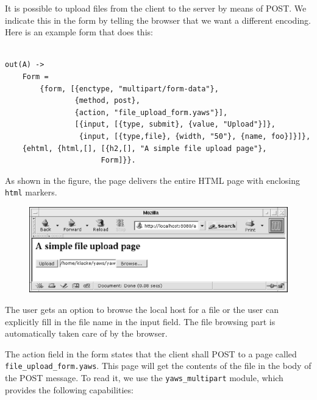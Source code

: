 \documentclass[11pt,oneside,english]{book}
\begin{document}
It is possible to upload files from the client to the server by
means of POST. We indicate this in the form by telling the browser that we
want a different encoding. Here is an example form that does this:
\begin{verbatim}

out(A) ->
    Form =
        {form, [{enctype, "multipart/form-data"},
                {method, post},
                {action, "file_upload_form.yaws"}],
                [{input, [{type, submit}, {value, "Upload"}]},
                 {input, [{type,file}, {width, "50"}, {name, foo}]}]},
    {ehtml, {html,[], [{h2,[], "A simple file upload page"},
                      Form]}}.

\end{verbatim}

As shown in the figure, the page delivers the entire HTML page with
enclosing \verb+html+ markers.


\begin{figure}[h]
\begin{center}

 \includegraphics[scale=0.6] {b}

\end{center}
\end{figure}

The user gets an option to browse the local host for a file
or the user can explicitly fill in the file name in the input
field. The file browsing part is automatically taken care of by the
browser.

The action field in the form states that the client shall POST to a
page called \verb+file_upload_form.yaws+. This page will get the
contents of the file in the body of the POST message. To read it, we
use the \verb+yaws_multipart+ module, which provides the following
capabilities:
\end{document}
